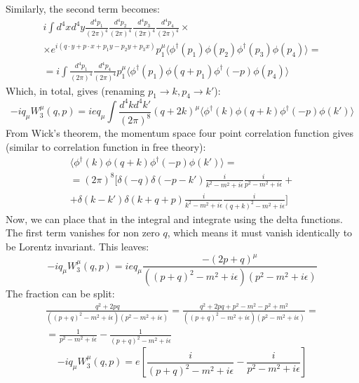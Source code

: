 \documentclass{article}
\begin{document}
Similarly, the second term becomes:
\begin{equation}
\begin{gathered}
    i\int d^4x d^4y \frac{d^4p_1}{(2\pi)^4} \frac{d^4p_2}{(2\pi)^4} \frac{d^4p_3}{(2\pi)^4} \frac{d^4p_4}{(2\pi)^4} \times \\ \times
    e^{i(q\cdot y + p \cdot x + p_1 y - p_2 y + p_3 x)}
    p_1^\mu
    \langle
        \phi^\dagger(p_1) \phi(p_2) \phi^\dagger(p_3) \phi(p_4)
    \rangle = \\ =
    i\int \frac{d^4p_1}{(2\pi)^4} \frac{d^4p_4}{(2\pi)^4}
    p_1^\mu
    \langle
        \phi^\dagger(p_1) \phi(q + p_1) \phi^\dagger(-p) \phi(p_4)
    \rangle
\end{gathered}
\end{equation}
Which, in total, gives (renaming $p_1 \rightarrow k, p_4 \rightarrow k'$):
\begin{equation}
    -i q_\mu W_3^\mu (q, p) = i e q_\mu \int \frac{d^4kd^4k'}{(2\pi)^8} \left(q + 2k\right)^\mu
    \langle
        \phi^\dagger(k) \phi(q + k) \phi^\dagger(-p) \phi(k')
    \rangle
\end{equation}
From Wick's theorem, the momentum space four point correlation function gives (similar to correlation function in free theory):
\begin{equation}
\begin{gathered}
    \langle
        \phi^\dagger(k) \phi(q + k) \phi^\dagger(-p) \phi(k')
    \rangle = \\ =
    (2\pi)^8 \Bigg[
        \delta(-q)\delta(-p - k')\frac{i}{k^2 - m^2 + i\epsilon}\frac{i}{p^2 - m^2 + i\epsilon} + \\ +
        \delta(k - k')\delta(k + q + p)\frac{i}{k^2 - m^2 + i\epsilon}\frac{i}{(q + k)^2 - m^2 + i\epsilon}
    \Bigg]
\end{gathered}
\end{equation}
Now, we can place that in the integral and integrate using the delta functions. The first term vanishes for non zero $q$, which means it must vanish identically to be Lorentz invariant. This leaves:
\begin{equation}
    -i q_\mu W_3^\mu (q, p) = i e q_\mu \frac{-(2p + q)^\mu}{((p + q)^2 - m^2 + i\epsilon)(p^2 - m^2 + i\epsilon)}
\end{equation}
The fraction can be split:
\begin{equation}
\begin{gathered}
    \frac{q^2 + 2pq}{((p + q)^2 - m^2 + i\epsilon)(p^2 - m^2 + i\epsilon)} =
    \frac{q^2 + 2pq + p^2 - m^2 - p^2 + m^2}{((p + q)^2 - m^2 + i\epsilon)(p^2 - m^2 + i\epsilon)} = \\ =
    \frac{1}{p^2 - m^2 + i\epsilon} - \frac{1}{(p + q)^2 - m^2 + i\epsilon}
\end{gathered}
\end{equation}
\begin{equation}
    -i q_\mu W_3^\mu (q, p) = e\left[\frac{i}{(p + q)^2 - m^2 + i\epsilon} - \frac{i}{p^2 - m^2 + i\epsilon}\right]
\end{equation}
\end{document}
